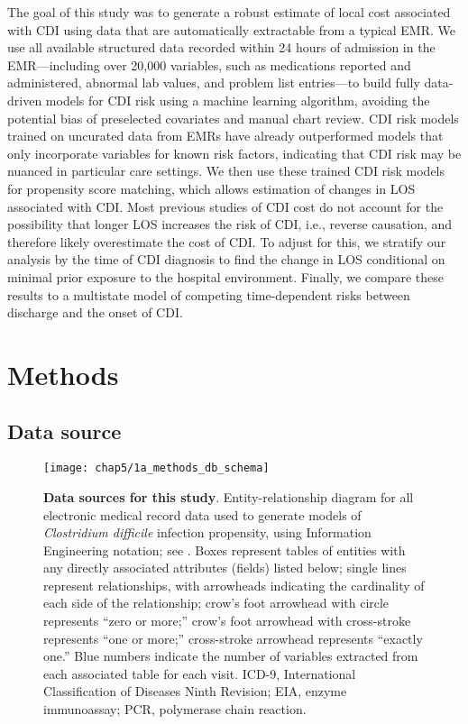 The goal of this study was to generate a robust estimate of local cost associated with CDI using data that are automatically extractable from a typical EMR. We use all available structured data recorded within 24 hours of admission in the EMR—including over 20,000 variables, such as medications reported and administered, abnormal lab values, and problem list entries—to build fully data-driven models for CDI risk using a machine learning algorithm, avoiding the potential bias of preselected covariates and manual chart review. CDI risk models trained on uncurated data from EMRs have already outperformed models that only incorporate variables for known risk factors, indicating that CDI risk may be nuanced in particular care settings.\autocite{Wiens2014} We then use these trained CDI risk models for propensity score matching, which allows estimation of changes in LOS associated with CDI. Most previous studies of CDI cost do not account for the possibility that longer LOS increases the risk of CDI, i.e., reverse causation, and therefore likely overestimate the cost of CDI.\autocite{Mitchell2014,Stevens2015} To adjust for this, we stratify our analysis by the time of CDI diagnosis to find the change in LOS conditional on minimal prior exposure to the hospital environment. Finally, we compare these results to a multistate model of competing time-dependent risks between discharge and the onset of CDI.

\section{Methods}

\subsection{Data source}

\begin{figure}[htb]
  \texttt{[image: chap5/1a\_methods\_db\_schema]}               
  \caption[Data sources for this study]{\textbf{Data sources for this study}. Entity-relationship diagram for all electronic medical record data used to generate models of \emph{Clostridium difficile} infection propensity, using Information Engineering notation; see \textcite{Halpin2010}. Boxes represent tables of entities with any directly associated attributes (fields) listed below; single lines represent relationships, with arrowheads indicating the cardinality of each side of the relationship; crow’s foot arrowhead with circle represents “zero or more;” crow’s foot arrowhead with cross-stroke represents “one or more;” cross-stroke arrowhead represents “exactly one.” Blue numbers indicate the number of variables extracted from each associated table for each visit. ICD-9, International Classification of Diseases Ninth Revision; EIA, enzyme immunoassay; PCR, polymerase chain reaction.}
  \label{fig:db_schema}
\end{figure}

